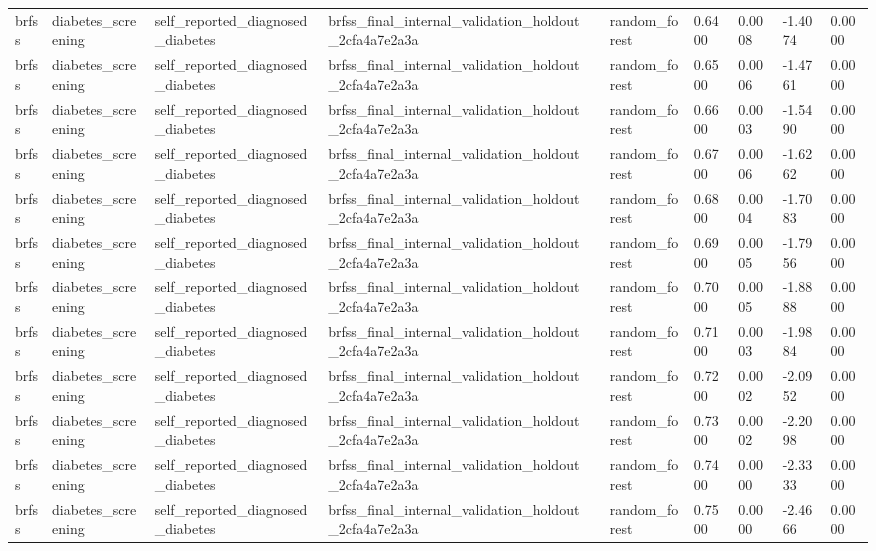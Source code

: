 \begin{tabular}{llllllllll}
brfss & diabetes\_screening & self\_reported\_diagnosed\_diabetes & brfss\_final\_internal\_validation\_holdout\_2cfa4a7e2a3a &  & random\_forest & 0.6400 & 0.0008 & -1.4074 & 0.0000 \\
brfss & diabetes\_screening & self\_reported\_diagnosed\_diabetes & brfss\_final\_internal\_validation\_holdout\_2cfa4a7e2a3a &  & random\_forest & 0.6500 & 0.0006 & -1.4761 & 0.0000 \\
brfss & diabetes\_screening & self\_reported\_diagnosed\_diabetes & brfss\_final\_internal\_validation\_holdout\_2cfa4a7e2a3a &  & random\_forest & 0.6600 & 0.0003 & -1.5490 & 0.0000 \\
brfss & diabetes\_screening & self\_reported\_diagnosed\_diabetes & brfss\_final\_internal\_validation\_holdout\_2cfa4a7e2a3a &  & random\_forest & 0.6700 & 0.0006 & -1.6262 & 0.0000 \\
brfss & diabetes\_screening & self\_reported\_diagnosed\_diabetes & brfss\_final\_internal\_validation\_holdout\_2cfa4a7e2a3a &  & random\_forest & 0.6800 & 0.0004 & -1.7083 & 0.0000 \\
brfss & diabetes\_screening & self\_reported\_diagnosed\_diabetes & brfss\_final\_internal\_validation\_holdout\_2cfa4a7e2a3a &  & random\_forest & 0.6900 & 0.0005 & -1.7956 & 0.0000 \\
brfss & diabetes\_screening & self\_reported\_diagnosed\_diabetes & brfss\_final\_internal\_validation\_holdout\_2cfa4a7e2a3a &  & random\_forest & 0.7000 & 0.0005 & -1.8888 & 0.0000 \\
brfss & diabetes\_screening & self\_reported\_diagnosed\_diabetes & brfss\_final\_internal\_validation\_holdout\_2cfa4a7e2a3a &  & random\_forest & 0.7100 & 0.0003 & -1.9884 & 0.0000 \\
brfss & diabetes\_screening & self\_reported\_diagnosed\_diabetes & brfss\_final\_internal\_validation\_holdout\_2cfa4a7e2a3a &  & random\_forest & 0.7200 & 0.0002 & -2.0952 & 0.0000 \\
brfss & diabetes\_screening & self\_reported\_diagnosed\_diabetes & brfss\_final\_internal\_validation\_holdout\_2cfa4a7e2a3a &  & random\_forest & 0.7300 & 0.0002 & -2.2098 & 0.0000 \\
brfss & diabetes\_screening & self\_reported\_diagnosed\_diabetes & brfss\_final\_internal\_validation\_holdout\_2cfa4a7e2a3a &  & random\_forest & 0.7400 & 0.0000 & -2.3333 & 0.0000 \\
brfss & diabetes\_screening & self\_reported\_diagnosed\_diabetes & brfss\_final\_internal\_validation\_holdout\_2cfa4a7e2a3a &  & random\_forest & 0.7500 & 0.0000 & -2.4666 & 0.0000 \\

\end{tabular}
